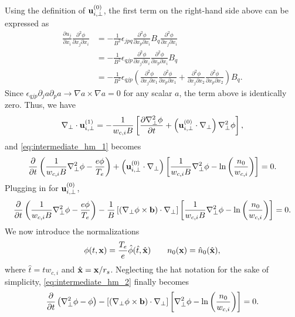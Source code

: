 \documentclass[oneside,a4paper,11pt]{report}
\begin{document}
Using the definition of $\mathbf{u}_{i,\perp}^{(0)}$, the first term on the right-hand side above can be expressed as
\begin{align}
    \frac{\partial u_j}{\partial x_i} \frac{\partial^2 \phi}{\partial x_j \partial x_i} &= -\frac{1}{B^2} \epsilon_{jpq} \frac{\partial^2 \phi}{\partial x_p \partial x_i} B_q \frac{\partial^2 \phi}{\partial x_j \partial x_i} \nonumber \\
    &= -\frac{1}{B^2} \epsilon_{qjp} \frac{\partial^2 \phi}{\partial x_j \partial x_i} \frac{\partial^2 \phi}{\partial x_p \partial x_i} B_q  \nonumber \\
    &= -\frac{1}{B^2} \epsilon_{qjp} \left ( \frac{\partial^2 \phi}{\partial x_j \partial x_1} \frac{\partial^2 \phi}{\partial x_p \partial x_1} + \frac{\partial^2 \phi}{\partial x_j \partial x_2} \frac{\partial^2 \phi}{\partial x_p \partial x_2}  \right ) B_q.
\end{align}
Since $\epsilon_{qjp} \partial_j a \partial_p a \to \nabla a \times \nabla a = 0$ for any scalar $a$, the term above is identically zero. Thus, we have
\begin{equation}
    \nabla_\perp \cdot \mathbf{u}_{i,\perp}^{(1)} = -\frac{1}{w_{c,i} B} \left [ \frac{\partial \nabla_\perp^2 \phi}{\partial t} + \left ( \mathbf{u}_{i,\perp}^{(0)} \cdot \nabla_\perp \right ) \nabla_\perp^2 \phi \right ],
\end{equation}
and \cref{eq:intermediate_hm_1} becomes
\begin{equation}
   \frac{\partial}{\partial t}\left ( \frac{1}{w_{c,i} B}\nabla_\perp^2 \phi - \frac{e \phi}{T_e} \right ) + \left (\mathbf{u}_{i,\perp}^{(0)} \cdot \nabla_\perp \right) \left [ \frac{1}{w_{c,i} B} \nabla_\perp^2 \phi - \ln \left( \frac{n_0}{w_{c,i}} \right) \right] = 0.
\end{equation}
Plugging in for $\mathbf{u}_{i,\perp}^{(0)}$,
\begin{equation}
\label{eq:intermediate_hm_2}
   \frac{\partial}{\partial t}\left ( \frac{1}{w_{c,i} B}\nabla_\perp^2 \phi - \frac{e \phi}{T_e} \right ) - \frac{1}{B} \left [ \left( \nabla_\perp \phi \times \mathbf{b} \right) \cdot \nabla_\perp \right] \left [ \frac{1}{w_{c,i} B} \nabla_\perp^2 \phi - \ln \left ( \frac{n_0}{w_{c,i}} \right) \right ] = 0.
\end{equation}
We now introduce the normalizations
\begin{equation}
    \phi(t,\mathbf{x}) = \frac{T_e}{e} \hat{\phi}(\hat{t},\hat{\mathbf{x}}) \qquad n_0(\mathbf{x}) = \hat{n}_0(\hat{\mathbf{x}}),
\end{equation}
where $\hat{t} = t w_{c,i}$ and $\hat{\mathbf{x}} = \mathbf{x} / r_s$. Neglecting the hat notation for the sake of simplicity, \cref{eq:intermediate_hm_2} finally becomes
\begin{equation}
   \frac{\partial}{\partial t}\left ( \nabla_\perp^2 \phi - \phi \right ) - \left [ \left( \nabla_\perp \phi \times \mathbf{b} \right) \cdot \nabla_\perp \right] \left [ \nabla_\perp^2 \phi - \ln \left( \frac{n_0}{w_{c,i}} \right) \right ] = 0.
\end{equation}
\end{document}
